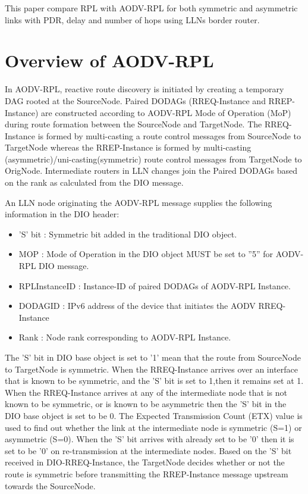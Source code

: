 \documentclass[conference, letterpaper]{IEEEtran}
\begin{document}
This paper compare RPL with AODV-RPL for both symmetric and asymmetric
links with PDR, delay and number of hops using LLNs border router.

\section{Overview of AODV-RPL}\label{Section.III} In AODV-RPL, reactive
route discovery is initiated by creating a temporary DAG rooted at the
SourceNode. Paired DODAGs (RREQ-Instance and RREP-Instance) are constructed
according to AODV-RPL Mode of Operation (MoP) during route formation between
the SourceNode and TargetNode. The RREQ-Instance is formed by multi-casting a
route control messages from SourceNode to TargetNode whereas the RREP-Instance
is formed by multi-casting (asymmetric)/uni-casting(symmetric) route control
messages from TargetNode to OrigNode. Intermediate routers in LLN changes join
the Paired DODAGs based on the rank as calculated from the DIO message.

An LLN node originating the AODV-RPL message supplies the following
information in the DIO header:
\begin{itemize}

\item ’S’ bit       : Symmetric bit added in the traditional
DIO object.
\item MOP           : Mode of Operation in the DIO object MUST be set to ”5”
for AODV-RPL DIO	message.
\item RPLInstanceID : Instance-ID of paired DODAGs of AODV-RPL Instance.
\item DODAGID       : IPv6 address of the device that initiates the AODV RREQ-Instance
\item Rank          : Node rank corresponding  to AODV-RPL Instance.
\end{itemize}


The ’S’ bit in DIO base object is set to '1' mean that the route from
SourceNode to TargetNode is symmetric. When the RREQ-Instance arrives over an
interface that is known to be symmetric, and the ’S’ bit is set to 1,then it
remains set at 1. When the 	RREQ-Instance arrives at any of the
intermediate node that 	is not known to be symmetric, or is known to be
asymmetric 	then the ’S’ bit in the DIO base object is set to be 0. The
Expected Transmission Count (ETX) value is used to find out whether the link at
the intermediate node is symmetric 	(S=1) or asymmetric (S=0). When the ’S’
bit arrives with already set to be ’0’ then it is set to be ’0’ on
re-transmission at the intermediate nodes. Based on the ’S’ bit
received in DIO-RREQ-Instance, the TargetNode decides whether or not the route
is symmetric before transmitting the RREP-Instance message upstream towards the
SourceNode.
\end{document}

